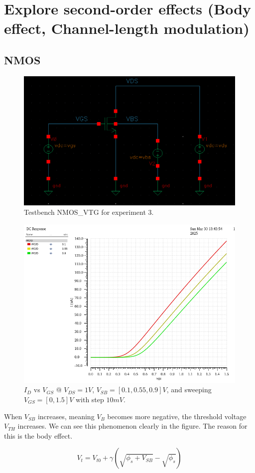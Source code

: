 \newpage
\section{Explore second-order effects (Body effect, Channel-length modulation)}

\subsection{NMOS}

\begin{figure}[H]
	\centering
	\includegraphics[width = 0.6\linewidth]{sections/pic/EX3_NMOS_schematic.png}
	\caption{Testbench NMOS\_VTG for experiment 3.}
	\label{f_ex3NMOS-schematic}
\end{figure}


\begin{figure}[H]
	\centering
	\includegraphics[width=.6\linewidth]{sections/pic/EX3_NMOS_Id&Vgs(Vds=0_1)(w)(l).png}
	\caption{$I_{D}$ vs $V_{GS}$ @ $V_{DS} = 1V$, $V_{SB} = [0.1, 0.55, 0.9] V$, and sweeping $V_{GS} = [0, 1.5]V$ with step $10mV$.}
	\label{f_EX3_NMOS_Id&Vgs(Vds=0_1)(w)(l)}
\end{figure}

\begin{discussion}
	\item When \( V_{SB} \) increases, meaning \( V_{B} \) becomes more negative, the threshold voltage \( V_{TH} \) increases. We can see this phenomenon clearly in the figure. The reason for this is the body effect.  
	
	\[ V_t = V_{t0} + \gamma \left( \sqrt{\phi_{s} + V_{SB}} - \sqrt{\phi_{s}} \right) \]
\end{discussion}

